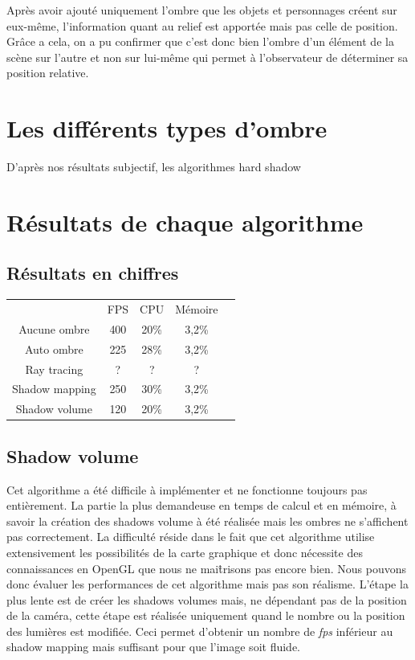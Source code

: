\documentclass[a4paper,10pt]{report}
\begin{document}
Après avoir ajouté uniquement l'ombre que les objets et personnages créent sur eux-même, l'information quant au relief est apportée mais pas celle de position. Gr\^ace a cela, on a pu confirmer que c'est donc bien l'ombre d'un élément de la scène sur l'autre et non sur lui-même qui permet à l'observateur de déterminer sa position relative.

\section{Les différents types d'ombre}

D'après nos résultats subjectif, les algorithmes hard shadow

\section{Résultats de chaque algorithme}

\subsection{Résultats en chiffres}

\begin{table}[h]
\centering
\begin{tabular}{|c|c|c|c|l}
\cline{1-4}
 & FPS  & CPU & Mémoire  &  \\ \cline{1-4}
 Aucune ombre& 400 & 20\%  & 3,2\%  &  \\ \cline{1-4}
 Auto ombre& 225 & 28\%  & 3,2\%  &  \\ \cline{1-4}
 Ray tracing& ? & ?  & ?  &  \\ \cline{1-4}
 Shadow mapping& 250  & 30\%  & 3,2\%  &  \\ \cline{1-4}
 Shadow volume& 120  & 20\%  & 3,2\%  &  \\ \cline{1-4}
\end{tabular}
\end{table}

\subsection{Shadow volume}
Cet algorithme a été difficile à implémenter et ne fonctionne toujours pas entièrement. La partie la plus demandeuse en temps de calcul et en mémoire, à savoir la création des shadows volume à été réalisée mais les ombres ne s'affichent pas correctement. La difficulté réside dans le fait que cet algorithme utilise extensivement les possibilités de la carte graphique et donc nécessite des connaissances en OpenGL que nous ne mai\^trisons pas encore bien.
Nous pouvons donc évaluer les performances de cet algorithme mais pas son réalisme.
L'étape la plus lente est de créer les shadows volumes mais, ne dépendant pas de la position de la caméra, cette étape est réalisée uniquement quand le nombre ou la position des lumières est modifiée.
Ceci permet d'obtenir un nombre de \textit{fps} inférieur au shadow mapping mais suffisant pour que l'image soit fluide.
\end{document}
